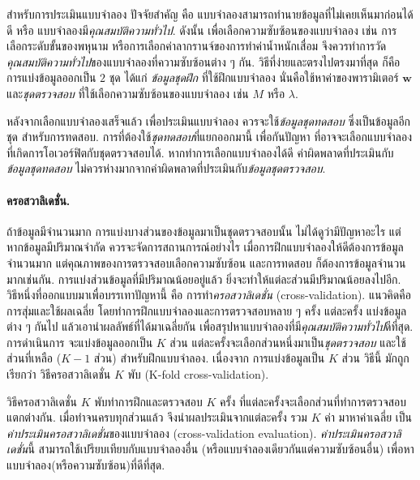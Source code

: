 สำหรับการประเมินแบบจำลอง ปัจจัยสำคัญ คือ แบบจำลองสามารถทำนายข้อมูลที่ไม่เคยเห็นมาก่อนได้ดี 
หรือ แบบจำลองมี\textit{คุณสมบัติความทั่วไป}.
ดังนั้น 
เพื่อเลือกความซับซ้อนของแบบจำลอง เช่น การเลือกระดับขั้นของพหุนาม 
หรือการเลือกค่าลากรานจ์ของการทำค่าน้ำหนักเสื่อม 
จึงควรทำการวัด\textit{คุณสมบัติความทั่วไป}ของแบบจำลองที่ความซับซ้อนต่าง ๆ กัน.
วิธีที่ง่ายและตรงไปตรงมาที่สุด ก็คือ การแบ่งข้อมูลออกเป็น $2$ ชุด
ได้แก่ \textit{ข้อมูลชุดฝึก} ที่ใช้ฝึกแบบจำลอง นั่นคือใช้หาค่าของพารามิเตอร์ $\mathbf{w}$ 
และ\textit{ชุดตรวจสอบ}
ที่ใช้เลือกความซับซ้อนของแบบจำลอง เช่น $M$ หรือ $\lambda$.

หลังจากเลือกแบบจำลองเสร็จแล้ว 
เพื่อประเมินแบบจำลอง ควรจะใช้\textit{ข้อมูลชุดทดสอบ} ซึ่งเป็นข้อมูลอีกชุด สำหรับการทดสอบ.
การที่ต้องใช้\textit{ชุดทดสอบ}ที่แยกออกมานี้ เพื่อกันปัญหา ที่อาจจะเลือกแบบจำลองที่เกิดการโอเวอร์ฟิตกับชุดตรวจสอบได้.
หากทำการเลือกแบบจำลองได้ดี ค่าผิดพลาดที่ประเมินกับ\textit{ข้อมูลชุดทดสอบ} ไม่ควรห่างมากจากค่าผิดพลาดที่ประเมินกับ\textit{ข้อมูลชุดตรวจสอบ}.

\paragraph{ครอสวาลิเดชั่น.}
ถ้าข้อมูลมีจำนวนมาก
การแบ่งบางส่วนของข้อมูลมาเป็นชุดตรวจสอบนั้น ไม่ได้ดูว่ามีปัญหาอะไร
แต่หากข้อมูลมีปริมาณจำกัด ควรจะจัดการสถานการณ์อย่างไร 
เมื่อการฝึกแบบจำลองให้ดีต้องการข้อมูลจำนวนมาก
แต่คุณภาพของการตรวจสอบเลือกความซับซ้อน และการทดสอบ ก็ต้องการข้อมูลจำนวนมากเช่นกัน.
การแบ่งส่วนข้อมูลที่มีปริมาณน้อยอยู่แล้ว ยิ่งจะทำให้แต่ละส่วนมีปริมาณน้อยลงไปอีก.
วิธีหนึ่งที่ออกแบบมาเพื่อบรรเทาปัญหานี้ คือ การทำ\textit{ครอสวาลิเดชั่น} (cross-validation).  
แนวคิดคือ การสุ่มและใช้ผลเฉลี่ย
โดยทำการฝึกแบบจำลองและการตรวจสอบหลาย ๆ ครั้ง 
แต่ละครั้ง แบ่งข้อมูลต่าง ๆ กันไป
แล้วเอานำผลลัพธ์ที่ได้มาเฉลี่ยกัน เพื่อสรุปหาแบบจำลองที่มี\textit{คุณสมบัติความทั่วไป}ดีที่สุด.
การดำเนินการ จะแบ่งข้อมูลออกเป็น $K$ ส่วน 
แต่ละครั้งจะเลือกส่วนหนึ่งมาเป็น\textit{ชุดตรวจสอบ}
และใช้ส่วนที่เหลือ ($K-1$ ส่วน) สำหรับฝึกแบบจำลอง.
เนื่องจาก การแบ่งข้อมูลเป็น $K$ ส่วน 
วิธีนี้ มักถูกเรียกว่า วิธีครอสวาลิเดชั่น $K$ พับ (K-fold cross-validation).

วิธีครอสวาลิเดชั่น $K$ พับทำการฝึกและตรวจสอบ $K$ ครั้ง
ที่แต่ละครั้งจะเลือกส่วนที่ทำการตรวจสอบแตกต่างกัน.
เมื่อทำจนครบทุกส่วนแล้ว จึงนำผลประเมินจากแต่ละครั้ง รวม $K$ ค่า มาหาค่าเฉลี่ย เป็น\textit{ค่าประเมินครอสวาลิเดชั่น}ของแบบจำลอง (cross-validation evaluation).
\textit{ค่าประเมินครอสวาลิเดชั่น}นี้
สามารถใช้เปรียบเทียบกับแบบจำลองอื่น (หรือแบบจำลองเดียวกันแต่ความซับซ้อนอื่น) เพื่อหาแบบจำลอง(หรือความซับซ้อน)ที่ดีที่สุด.

